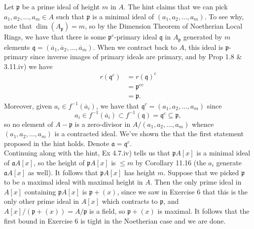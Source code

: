 \documentclass{article}
\theoremstyle{definition}
\begin{document}
Let $\mathfrak{p}$ be a prime ideal of height $m$ in $A$. The hint claims that
we can pick $a_1, a_2, \ldots, a_m \in A$ such that $\mathfrak{p}$ is a minimal
ideal of $(a_1, a_2, \ldots, a_m)$. To see why, note that
$\dim(A_{\mathfrak{p}}) = m$, so by the Dimension Theorem of Noetherian Local
Rings, we have that there is some $\mathfrak{p}^{e}$-primary ideal
$\mathfrak{q}$ in $A_{\mathfrak{p}}$ generated by $m$ elements $\mathfrak{q} =
(\overline{a}_1, \overline{a}_2, \ldots, \overline{a}_m)$. When we contract
back to $A$, this ideal is $\mathfrak{p}$-primary since inverse images of
primary ideals are primary, and by Prop 1.8 \& 3.11.iv) we have 
\begin{align*}
	r(\mathfrak{q}^{c})
	&=
	r(\mathfrak{q})^{c} \\
	&=
	\mathfrak{p}^{ec} \\
	&=
	\mathfrak{p}.
\end{align*}
Moreover, given $a_i \in f^{-1}(\overline{a}_i)$, we have that
$\mathfrak{q}^{c} = (a_1, a_2, \ldots, a_m)$ since 
\[
	a_i \in f^{-1}(\overline{a}_i) \subset f^{-1}(\mathfrak{q}) = \mathfrak{q}^{c} \subseteq \mathfrak{p},
\] 
so no element of $A - \mathfrak{p}$ is a zero-divisor in $A/(a_1, a_2, \ldots,
a_m)$ whence $(a_1, a_2, \ldots, a_m)$ is a contracted ideal. We've shown the
that the first statement proposed in the hint holds. Denote $\mathfrak{a} =
\mathfrak{q}^{c}$. \\

Continuing along with the hint, Ex 4.7.iv) tells us that $\mathfrak{p}A[x]$ is
a minimal ideal of $\mathfrak{a}A[x]$, so the height of $\mathfrak{p}A[x]$ is
$\leq m$ by Corollary 11.16 (the $a_i$ generate $\mathfrak{a}A[x]$ as well). It
follows that $\mathfrak{p}A[x]$ has height $m$. Suppose that we picked
$\mathfrak{p}$ to be a maximal ideal with maximal height in $A$. Then the only
prime ideal in $A[x]$ containing $\mathfrak{p}A[x]$ is $\mathfrak{p} + (x)$,
since we saw in Exercise 6 that this is the only other prime ideal in $A[x]$
which contracts to $\mathfrak{p}$, and $A[x]/(\mathfrak{p} + (x)) =
A/\mathfrak{p}$ is a field, so $\mathfrak{p} + (x)$ is maximal. It follows that
the first bound in Exercise 6 is tight in the Noetherian case and we are done.
\end{document}
